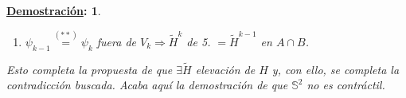 \documentclass[10pt,a4paper,openright]{book}
\theoremstyle{break}
\newtheorem*{demo}{\underline{Demostración}:}
\begin{document}
\begin{demo}
\begin{enumerate}
\begin{enumerate}
    \item[a) y b)] coinciden en $t = \psi_{k - 1} \left( x \right)$.
    \end{enumerate}

    \item $\psi_{k - 1} \stackrel{(**)}{=} \psi_k$ fuera de $V_k \Rightarrow \tilde{H}^k$ de 5. $= \tilde{H}^{k - 1}$ en $A \cap B$.
\end{enumerate}

Esto completa la propuesta de que $\exists \tilde{H}$ elevación de $H$ y, con ello, se completa la contradicción buscada. Acaba aquí la demostración de que $\mathbb{S}^{2}$ no es contráctil.
\end{demo}
\end{document}
